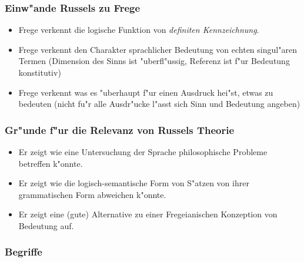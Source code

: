 \documentclass[]{scrartcl}
\begin{document}
\subsubsection{Einw"ande Russels zu Frege}
\begin{itemize}
  \item Frege verkennt die logische Funktion von \emph{definiten Kennzeichnung}.
  \item Frege verkennt den Charakter sprachlicher Bedeutung von echten singul"aren Termen (Dimension des Sinns ist "uberfl"ussig, Referenz ist f"ur Bedeutung konstitutiv)
  \item Frege verkennt was es "uberhaupt f"ur einen Ausdruck hei"st, etwas zu bedeuten (nicht fu"r alle Ausdr"ucke l"asst sich Sinn und Bedeutung angeben)
\end{itemize}

\subsubsection{Gr"unde f"ur die Relevanz von Russels Theorie}
\begin{itemize}
  \item Er zeigt wie eine Untersuchung der Sprache philosophische Probleme betreffen k"onnte.
  \item Er zeigt wie die logisch-semantische Form von S"atzen von ihrer grammatischen Form abweichen k"onnte.
  \item Er zeigt eine (gute) Alternative zu einer Fregeianischen Konzeption von Bedeutung auf.
\end{itemize}

\subsubsection{Begriffe}
\end{document}
